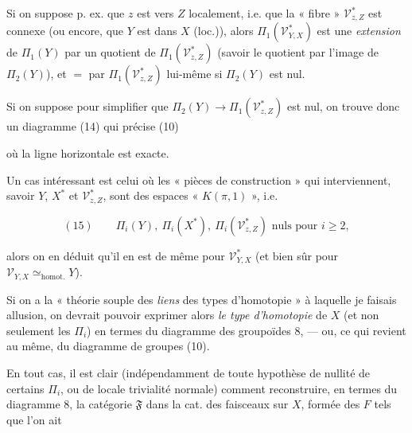 \documentclass[11pt,a4paper]{article}
\begin{document}

Si on suppose p. ex. que $z$ est  vers $Z$ localement,
i.e. que la « fibre » $\mathcal{V}^{*}_{z,Z}$ est connexe (ou encore, que $Y$
est  dans $X$ (loc.)), alors
$\Pi_1(\mathcal{V}^{*}_{Y,X})$ est une \emph{extension} de $\Pi_1(Y)$ par un
quotient de $\Pi_1(\mathcal{V}^{*}_{z,Z})$  (savoir le quotient
par l'image de $\Pi_2(Y)$), et $=$ par $\Pi_1(\mathcal{V}^{*}_{z,Z})$
lui-même si $\Pi_2(Y)$ est nul.

Si on suppose pour simplifier que
$\Pi_2(Y) \to \Pi_1(\mathcal{V}^{*}_{z,Z})$ est nul, on trouve donc un
diagramme (14) qui précise (10)


où la ligne horizontale est exacte.


Un cas intéressant est celui où les « pièces de construction » qui
interviennent, savoir $Y$, $X^{*}$ et $\mathcal{V}^{*}_{z,Z}$, sont des espaces
« $K(\pi,1)$ », i.e.

\[
  (15) \qquad \Pi_i(Y),\ \Pi_i(X^{*}),\ \Pi_i(\mathcal{V}^{*}_{z,Z})
    \text{ nuls pour } i \geq 2 ,
\]

alors on en déduit qu'il en est de même pour $\mathcal{V}^{*}_{Y,X}$ (et bien
sûr pour $\mathcal{V}_{Y,X} \simeq_{\text{homot.}} Y$).

Si on a la « théorie souple des \emph{liens} des types d'homotopie » à laquelle
je faisais   allusion, on devrait
pouvoir exprimer alors \emph{le type d'homotopie} de $X$ (et non seulement les
$\Pi_i$) en termes du diagramme des groupoïdes 8, — ou, ce qui revient au
même, du diagramme de groupes (10).

En tout cas, il est clair (indépendamment de toute hypothèse de nullité de
certains $\Pi_i$, ou de locale trivialité normale) comment reconstruire, en
termes du diagramme 8, la catégorie $\mathfrak{F}$ dans la cat. des faisceaux
sur $X$,  formée des $F$ tels que l'on ait
\end{document}
